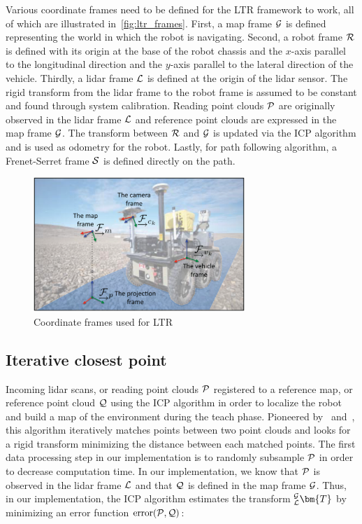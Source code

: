 Various coordinate frames need to be defined for the \ac{LTR} framework to work, all of which are illustrated in~\autoref{fig:ltr_frames}.
First, a map frame $\mathcal{G}$ is defined representing the world in which the robot is navigating.
Second, a robot frame $\mathcal{R}$ is defined with its origin at the base of the robot chassis and the $x$-axis parallel to the longitudinal direction and the $y$-axis parallel to the lateral direction of the vehicle.
Thirdly, a lidar frame $\mathcal{L}$ is defined at the origin of the lidar sensor. 
The rigid transform from the lidar frame to the robot frame \transform{\lidarf}{\robotf} is assumed to be constant and found through system calibration.
Reading point clouds $\mathcal{P}$ are originally observed in the lidar frame $\mathcal{L}$ and reference point clouds are expressed in the map frame $\mathcal{G}$.
The transform between $\mathcal{R}$ and $\mathcal{G}$ \transform{\robotf}{\mapf} is updated via the \ac{ICP} algorithm and is used as odometry for the robot.
Lastly, for path following algorithm, a Frenet-Serret frame $\mathcal{S}$ is defined directly on the path.

\begin{figure} [htpb]
	\centering
	\includegraphics[height=2.0in]{figs/warthog_frames.pdf}
	\caption{Coordinate frames used for \ac{LTR}}
	\label{fig:ltr_frames}
\end{figure}

\subsection{Iterative closest point}
\label{ICP}

Incoming lidar scans, or reading point clouds $\mathcal{P}$ registered to a reference map, or reference point cloud $\mathcal{Q}$ using the \ac{ICP} algorithm in order to localize the robot and build a map of the environment during the teach phase.
Pioneered by~\citet{Besl1992} and~\citet{Chen1991}, this algorithm iteratively matches points between two point clouds and looks for a rigid transform minimizing the distance between each matched points.
The first data processing step in our implementation is to randomly subsample $\mathcal{P}$ in order to decrease computation time.
In our implementation, we know that $\mathcal{P}$ is observed in the lidar frame $\mathcal{L}$ and that $\mathcal{Q}$ is defined in the map frame $\mathcal{G}$. 
Thus, in our implementation, the \ac{ICP} algorithm estimates the transform $_{\lidarf}^{\mapf}\bm{T}$ by minimizing an error function $\text{error}(\mathcal{P}, \mathcal{Q})$:

